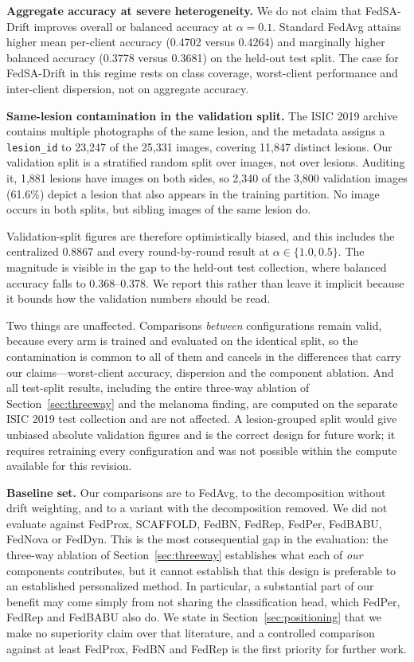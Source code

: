 \documentclass[utf8]{FrontiersinHarvard} %
\newcommand{\sadrift}{FedSA-Drift}
\begin{document}
\textbf{Aggregate accuracy at severe heterogeneity.} We do not claim that \sadrift{} improves overall or balanced accuracy at $\alpha = 0.1$. Standard FedAvg attains higher mean per-client accuracy (0.4702 versus 0.4264) and marginally higher balanced accuracy (0.3778 versus 0.3681) on the held-out test split. The case for \sadrift{} in this regime rests on class coverage, worst-client performance and inter-client dispersion, not on aggregate accuracy.

\textbf{Same-lesion contamination in the validation split.} The ISIC 2019 archive contains multiple photographs of the same lesion, and the metadata assigns a \texttt{lesion\_id} to 23,247 of the 25,331 images, covering 11,847 distinct lesions. Our validation split is a stratified random split over images, not over lesions. Auditing it, 1,881 lesions have images on both sides, so 2,340 of the 3,800 validation images (61.6\%) depict a lesion that also appears in the training partition. No image occurs in both splits, but sibling images of the same lesion do.

Validation-split figures are therefore optimistically biased, and this includes the centralized 0.8867 and every round-by-round result at $\alpha \in \{1.0, 0.5\}$. The magnitude is visible in the gap to the held-out test collection, where balanced accuracy falls to 0.368--0.378. We report this rather than leave it implicit because it bounds how the validation numbers should be read.

Two things are unaffected. Comparisons \emph{between} configurations remain valid, because every arm is trained and evaluated on the identical split, so the contamination is common to all of them and cancels in the differences that carry our claims---worst-client accuracy, dispersion and the component ablation. And all test-split results, including the entire three-way ablation of Section~\ref{sec:threeway} and the melanoma finding, are computed on the separate ISIC 2019 test collection and are not affected. A lesion-grouped split would give unbiased absolute validation figures and is the correct design for future work; it requires retraining every configuration and was not possible within the compute available for this revision.

\textbf{Baseline set.} Our comparisons are to FedAvg, to the decomposition without drift weighting, and to a variant with the decomposition removed. We did not evaluate against FedProx, SCAFFOLD, FedBN, FedRep, FedPer, FedBABU, FedNova or FedDyn. This is the most consequential gap in the evaluation: the three-way ablation of Section~\ref{sec:threeway} establishes what each of \emph{our} components contributes, but it cannot establish that this design is preferable to an established personalized method. In particular, a substantial part of our benefit may come simply from not sharing the classification head, which FedPer, FedRep and FedBABU also do. We state in Section~\ref{sec:positioning} that we make no superiority claim over that literature, and a controlled comparison against at least FedProx, FedBN and FedRep is the first priority for further work.
\end{document}
